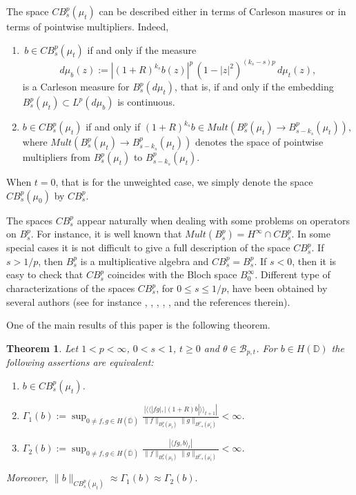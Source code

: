 \documentclass[12pt,twoside,leqno,final]{amsart}
\theoremstyle{plain}
\newtheorem{thm}{Theorem}[section]
\begin{document}
The space $CB^p_s(\mu_t)$ can be described either in terms of Carleson masures or in terms 
of pointwise multipliers. Indeed, 

\begin{enumerate}
\item \,$b\in CB^p_s(\mu_t)$ if and only if the measure 
$$
d\mu_b(z):=|(1+R)^{k_s} b(z)|^p\,(1-|z|^2)^{(k_s-s)p}\,d\mu_t(z),
$$ 
is a Carleson measure for $B^p_s(d\mu_t)$,
that is, if and only if   the embedding $B^p_s(\mu_t)\subset L^p(d\mu_b)$ is continuous.

\item $b\in CB^p_s(\mu_t)$ if and only if $(1+R)^{k_s}b\in Mult(B^p_s(\mu_t)\to B^p_{s-k_s}(\mu_t)),$
where $Mult(B^p_s(\mu_t)\to B^p_{s-k_s}(\mu_t))$ denotes the space of pointwise multipliers from 
$B^p_s(\mu_t)$ to $B^p_{s-k_s}(\mu_t)$.
\end{enumerate}

When $t=0$, that is for the unweighted case,  we simply denote the space $CB^p_s(\mu_0)$ by $CB^p_s$.

The spaces $CB^p_s$ appear naturally when dealing with some problems on operators on $B^p_s$. For instance, it is well known that 
$Mult(B^p_s)=H^\infty\cap CB^p_s$. 
In some special cases it is not difficult to give a full description of the space $CB^p_s$.
If $s>1/p$, then  $B^p_s$ is a multiplicative algebra and  $CB^p_s=B^p_s$. 
If $s<0$, then it is easy to check that $CB^p_s$ coincides with the Bloch space $B^\infty_0$.
Different type of characterizations of the spaces $CB^p_s$, for $0\le s\le 1/p$, have been obtained by several authors 
(see for instance \cite{Ste},  \cite{Ar-Ro-Saw}, \cite{Ro-Wu}, \cite{Ar-Ro-Saw-W2}, \cite{Ca-Or1}, \cite{Ca-Or2}  
 and the references therein). 

One of the main results of this paper is the following theorem.

\begin{thm} \label{thm:BF}
Let $1<p<\infty$, $0< s<1$, $t\ge 0$ and $\theta \in {{\mathcal B}}_{p,t}$. 
For $b\in H({{\mathbb D}})$ the following assertions are equivalent:
\begin{enumerate}
	\item \label{item:BF1} $b\in CB^p_{s}(\mu_t)$.

	\item \label{item:BF3} $\displaystyle{\Gamma_1(b)
	:=\sup_{0\ne f,g\in H(\overline {{\mathbb D}})}\frac{|\langle\langle |fg|,|(1+R)b|\rangle\rangle_{t+1}|}
	{\|f\|_{B^p_{s}(\mu_t)}\|g\|_{B^{p'}_{-s}(\mu^\prime_t)}}<\infty}$.
	
	
	\item \label{item:BF2} $\displaystyle{
\Gamma_2(b):=\sup_{0\ne f,g\in H(\overline {{\mathbb D}})}
	\frac{|\langle fg,b\rangle_t|} {\|f\|_{B^p_{s}(\mu_t)}\|g\|_{B^{p'}_{-s}(\mu^\prime_t)}}<\infty}$.
\end{enumerate}

Moreover,  
$
\|b\|_{CB^p_s(\mu_t)}\approx \Gamma_1(b)
\approx \Gamma_2(b).
$
\end{thm}
\end{document}
